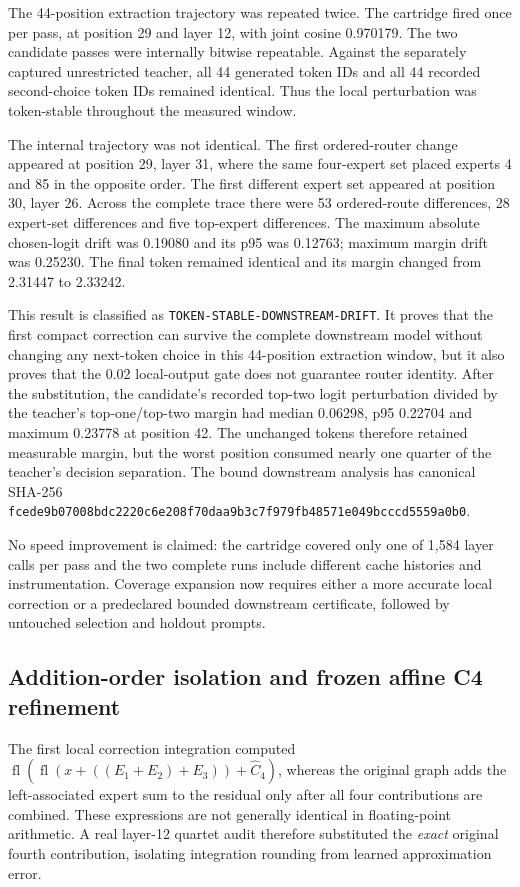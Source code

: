The 44-position extraction trajectory was repeated twice.  The cartridge fired
once per pass, at position 29 and layer 12, with joint cosine 0.970179.  The two
candidate passes were internally bitwise repeatable.  Against the separately
captured unrestricted teacher, all 44 generated token IDs and all 44 recorded
second-choice token IDs remained identical.  Thus the local perturbation was
token-stable throughout the measured window.

The internal trajectory was not identical.  The first ordered-router change
appeared at position 29, layer 31, where the same four-expert set placed experts
4 and 85 in the opposite order.  The first different expert set appeared at
position 30, layer 26.  Across the complete trace there were 53 ordered-route
differences, 28 expert-set differences and five top-expert differences.  The
maximum absolute chosen-logit drift was 0.19080 and its p95 was 0.12763; maximum
margin drift was 0.25230.  The final token remained identical and its margin
changed from 2.31447 to 2.33242.

This result is classified as \texttt{TOKEN-STABLE-DOWNSTREAM-DRIFT}.  It
proves that the first compact correction can survive the complete downstream
model without changing any next-token choice in this 44-position extraction
window, but it also proves that the 0.02 local-output gate does not guarantee
router identity.  After the substitution, the candidate's recorded top-two
logit perturbation divided by the teacher's top-one/top-two margin had median
0.06298, p95 0.22704 and maximum 0.23778 at position 42.  The unchanged tokens
therefore retained measurable margin, but the worst position consumed nearly
one quarter of the teacher's decision separation.  The bound downstream
analysis has canonical SHA-256
\texttt{fcede9b07008bdc2220c6e208f70daa9b3c7f979fb48571e049bcccd5559a0b0}.

No speed improvement is claimed: the cartridge covered only
one of 1,584 layer calls per pass and the two complete runs include different
cache histories and instrumentation.  Coverage expansion now requires either a
more accurate local correction or a predeclared bounded downstream certificate,
followed by untouched selection and holdout prompts.

\subsection{Addition-order isolation and frozen affine C4 refinement}

The first local correction integration computed
\(\operatorname{fl}(\operatorname{fl}(x+((E_1+E_2)+E_3))+\widehat C_4)\),
whereas the original graph adds the left-associated expert sum to the residual
only after all four contributions are combined.  These expressions are not
generally identical in floating-point arithmetic.  A real layer-12 quartet
audit therefore substituted the \emph{exact} original fourth contribution,
isolating integration rounding from learned approximation error.

